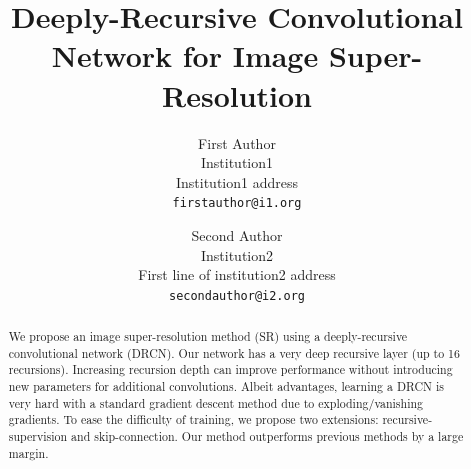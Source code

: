 \documentclass[10pt,twocolumn,letterpaper]{article}
\begin{document}


\title{Deeply-Recursive Convolutional Network for Image Super-Resolution}

\author{First Author\\
	Institution1\\
	Institution1 address\\
	{\tt\small firstauthor@i1.org}
	\and
	Second Author\\
	Institution2\\
	First line of institution2 address\\
	{\tt\small secondauthor@i2.org}
}

\maketitle



\begin{abstract}
We propose an image super-resolution method (SR) using a deeply-recursive convolutional network (DRCN). Our network has a very deep recursive layer (up to 16 recursions). Increasing recursion depth can improve performance without introducing new parameters for additional convolutions. Albeit advantages, learning a DRCN is very hard with a standard gradient descent method due to exploding/vanishing gradients. To ease the difficulty of training, we propose two extensions: recursive-supervision and skip-connection. Our method outperforms previous methods by a large margin.
\end{abstract}
\end{document}

